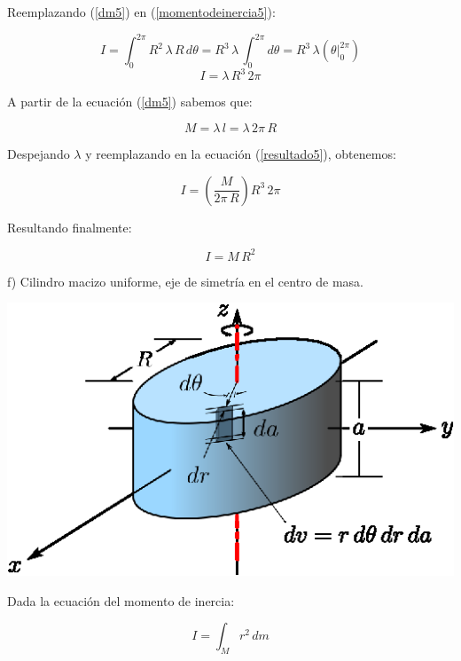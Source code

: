 \documentclass[letter,11pt]{article}
\begin{document}
Reemplazando (\ref{dm5}) en (\ref{momentodeinercia5}):

\begin{equation*}
    I = \int_{0}^{2\pi} R^2\, \lambda\, R\, d\theta = R^3\, \lambda\, \int_{0}^{2\pi} d\theta = R^3\, \lambda (\theta \Biggr|_{0}^{2\pi})
\end{equation*}
\begin{equation}
    I = \lambda\, R^3\, 2\pi
\label{resultado5}
\end{equation}

A partir de la ecuación (\ref{dm5}) sabemos que:

\begin{equation*}
    M = \lambda\, l = \lambda\, 2\pi\, R
\end{equation*}

Despejando $\lambda$ y reemplazando en la ecuación (\ref{resultado5}), obtenemos:

\begin{equation*}
    I = \left( \frac{M}{2\pi\, R} \right) R^3\, 2\pi
\end{equation*}

Resultando finalmente:

\begin{equation}
    I = M\, R^2
\end{equation}

\newpage
f) Cilindro macizo uniforme, eje de simetría en el centro de masa.

\begin{center}
\includegraphics[scale=1.75]{resources/f6.eps}
\end{center}

Dada la ecuación del momento de inercia:

\begin{equation}
    I = \int_{M} r^2\, dm
\label{momentodeinercia6}
\end{equation}
\end{document}
